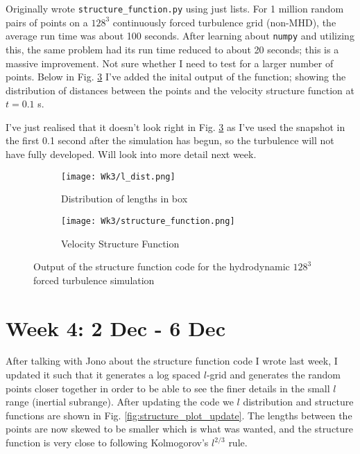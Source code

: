 \documentclass[12pt,letterpaper]{article}
\begin{document}
  Originally wrote \verb|structure_function.py| using just lists. For 1 million random pairs of points on a $128^3$ continuously forced turbulence grid (non-MHD), the average run time was about 100 seconds. After learning about \verb|numpy| and utilizing this, the same problem had its run time reduced to about 20 seconds; this is a massive improvement. Not sure whether I need to test for a larger number of points. Below in Fig. \ref{fig:structure_plots} I've added the inital output of the function; showing the distribution of distances between the points and the velocity structure function at $t=0.1$ s.

  I've just realised that it doesn't look right in Fig. \ref{fig:structure_plots} as I've used the snapshot in the first 0.1 second after the simulation has begun, so the turbulence will not have fully developed. Will look into more detail next week.

  \begin{figure}[!h]
   \centering
  \begin{subfigure}{.4\linewidth}
    \centering
  \texttt{[image: Wk3/l\_dist.png]}
  \caption{Distribution of lengths in box}
  \label{fig:l_dist}
  \end{subfigure}
  \begin{subfigure}{.4\linewidth}
    \centering
  \texttt{[image: Wk3/structure\_function.png]}
  \caption{Velocity Structure Function}
  \label{fig:struct_func}
  \end{subfigure}

  \caption{Output of the structure function code for the hydrodynamic $128^3$ forced turbulence simulation}
  \label{fig:structure_plots}
  \end{figure}

  \newpage
  \section*{Week 4: 2 Dec - 6 Dec}
  After talking with Jono about the structure function code I wrote last week, I updated it such that it generates a log spaced $l$-grid and generates the random points closer together in order to be able to see the finer details in the small $l$ range (inertial subrange). After updating the code we $l$ distribution and structure functions are shown in Fig. \ref{fig:structure_plot_update}. The lengths between the points are now skewed to be smaller which is what was wanted, and the structure function is very close to following Kolmogorov's $l^{2/3}$ rule.
\end{document}
